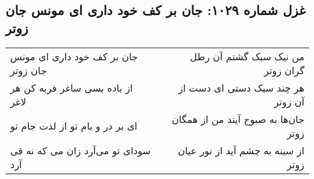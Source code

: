 \begin{center}
\section*{غزل شماره ۱۰۲۹: جان بر کف خود داری ای مونس جان زوتر}
\label{sec:1029}
\begin{longtable}{l p{0.5cm} r}
جان بر کف خود داری ای مونس جان زوتر
&&
من نیک سبک گشتم آن رطل گران زوتر
\\
از باده بسی ساغر فربه کن هر لاغر
&&
هر چند سبک دستی ای دست از آن زوتر
\\
ای بر در و بام تو از لذت جام تو
&&
جان‌ها به صبوح آیند من از همگان زوتر
\\
سودای تو می‌آرد زان می که نه قی آرد
&&
از سینه به چشم آید از نور عیان زوتر
\\
\end{longtable}
\end{center}
